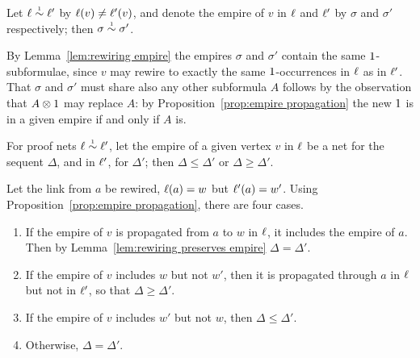 \documentclass[conference]{IEEEtran}
\begin{document}
\begin{lemma}
\label{lem:rewiring preserves empire}
Let $\links\perm*\links'$ by $\ell(v)\neq\ell'(v)$, and denote the empire of $v$ in $\ell$ and $\ell'$ by $\sigma$ and $\sigma'$ respectively; then $\sigma\perm*\sigma'$.
\end{lemma}

\begin{IEEEproof}
By Lemma~\ref{lem:rewiring empire} the empires $\sigma$ and $\sigma'$ contain the same $1$-subformulae, since $v$ may rewire to exactly the same $1$-occurrences in $\ell$ as in $\ell'$.
%
That $\sigma$ and $\sigma'$ must share also any other subformula $A$ follows by the observation that $A\otimes1$ may replace $A$: by Proposition~\ref{prop:empire propagation} the new $1$ is in a given empire if and only if $A$ is.
%
\end{IEEEproof}


\begin{lemma}
\label{lem:rewiring affects empires}
For proof nets $\links\perm*\links'$, let the empire of a given vertex $v$ in $\ell$ be a net for the sequent $\Delta$, and in $\ell'$, for $\Delta'$; then $\Delta\leq\Delta'$ or $\Delta\geq\Delta'$.
\end{lemma}


\begin{IEEEproof}
Let the link from $a$ be rewired, $\ell(a)=w$ but $\ell'(a)=w'$.
%
Using Proposition~\ref{prop:empire propagation}, there are four cases.
%
\begin{enumerate}
	\item
If the empire of $v$ is propagated from $a$ to $w$ in $\ell$, it includes the empire of $a$.
%
Then by Lemma~\ref{lem:rewiring preserves empire} $\Delta=\Delta'$.

	\item
If the empire of $v$ includes $w$ but not $w'$, then it is propagated through $a$ in $\ell$ but not in $\ell'$, so that $\Delta\geq\Delta'$.

	\item
If the empire of $v$ includes $w'$ but not $w$, then $\Delta\leq\Delta'$.

	\item
Otherwise, $\Delta=\Delta'$.
\end{enumerate}
\vskip-12pt
\end{IEEEproof}



\end{document}
